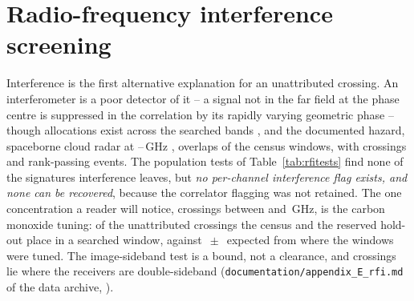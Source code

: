 \section{Radio-frequency interference screening}
\label{app:rfi}

Interference is the first alternative explanation for an unattributed
crossing. An interferometer is a poor detector of it -- a signal not in the
far field at the phase centre is suppressed in the correlation by its rapidly
varying geometric phase -- though allocations exist across the searched bands
\citep{ITU2024}, and the documented hazard, spaceborne cloud radar at
\RadarLo--\RadarHi\,GHz \citep{CloudSat2002,EarthCARE2023,ALMAMemo504},
overlaps \RadarNWin{} of the \RadarNTot{} census windows, with
\RadarNCross{} crossings and \RadarNStage{} rank-passing events. The
population tests of Table~\ref{tab:rfitests} find none of the signatures
interference leaves, but \emph{no per-channel interference flag exists, and
none can be recovered}, because the correlator flagging was not retained.
The one concentration a reader will notice, \TlBandAll{} crossings between
\TlBandLo{} and \TlBandHi\,GHz, is the carbon monoxide tuning: \TlBandObs{} of
the \TlBandNSub{} unattributed crossings the census and the reserved hold-out
place in a searched window, against \TlBandNull$\,\pm\,$\TlBandNullSd{}
expected from where the windows were tuned. The image-sideband test is a
bound, not a clearance, and \ImNDsb{} crossings lie where the receivers are
double-sideband (\texttt{documentation/\allowbreak appendix\_E\_rfi.md} of the
data archive, \citealt{SIdeposit}).


